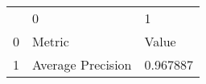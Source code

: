 \begin{tabular}{lll}
 & 0 & 1 \\
0 & Metric & Value \\
1 & Average Precision & 0.967887 \\
\end{tabular}
